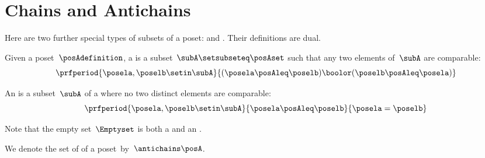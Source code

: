 
\section{Chains and Antichains}
\label{sec:chains-antichains}

Here are two further special types of subsets of a poset:  and .
Their definitions are dual.

\begin{definition}
    \label{def:chain}
    Given a poset~$\posAdefinition$, a  is a subset~$\subA \setsubseteq \posAset$ such that any two elements of~$\subA$ are comparable:
    \begin{equation}\label{eq:chain}
        \prfperiod{
            \posela,\poselb \setin \subA
        }{
            (\posela \posAleq \poselb) \boolor (\poselb \posAleq \posela)
        }
    \end{equation}
\end{definition}


\begin{definition}
    \label{def:antichain}
    An  is a subset~$\subA$ of a  where no two distinct elements are comparable:
    \begin{equation}\label{eq:antichain}
        \prfperiod{
            \posela, \poselb \setin \subA
        }{
            \posela \posAleq \poselb
        }{
            \posela = \poselb
        }
    \end{equation}
\end{definition}
\begin{remark}
    Note that the empty set~$\Emptyset$ is both a  and an .
\end{remark}

We denote the set of  of a poset~\posA by~$\antichains\posA$.

